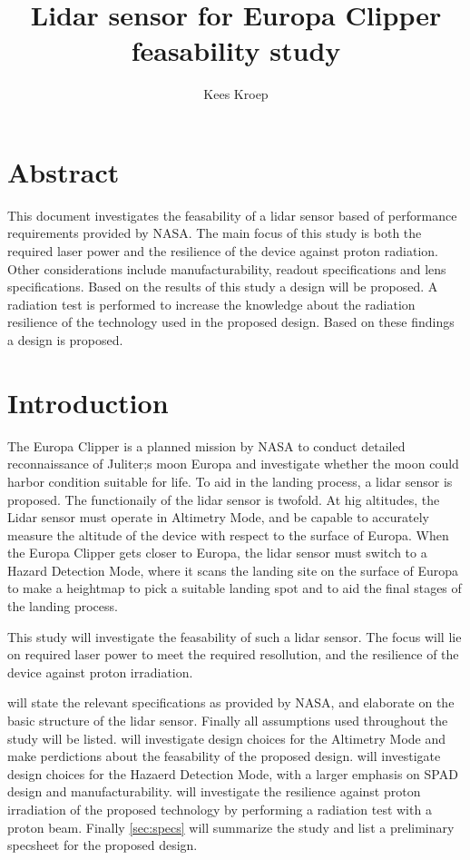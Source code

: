 \documentclass[]{report}
\title{Lidar sensor for Europa Clipper feasability study}
\author{Kees Kroep}
\begin{document}
  \maketitle


\section*{Abstract}
This document investigates the feasability of a lidar sensor based of performance requirements provided by NASA. The main focus of this study is both the required laser power and the resilience of the device against proton radiation. Other considerations include manufacturability, readout specifications and lens specifications. Based on the results of this study a design will be proposed. A radiation test is performed to increase the knowledge about the radiation resilience of the technology used in the proposed design. Based on these findings a design is proposed.

\tableofcontents
\clearpage

\section*{Introduction}
The Europa Clipper is a planned mission by NASA  to conduct  detailed reconnaissance of Juliter;s moon Europa and investigate whether the moon could harbor condition suitable for life. To aid in the landing process, a lidar sensor is proposed. The functionaily of the lidar sensor is twofold. At hig altitudes, the Lidar sensor must operate in Altimetry Mode, and be capable to accurately measure the altitude of the device with respect to the surface of Europa. When the Europa Clipper gets closer to Europa, the lidar sensor must switch to a Hazard Detection Mode, where it scans the landing site on the surface of Europa to make a heightmap to pick a suitable landing spot and to aid the final stages of the landing process.

This study will investigate the feasability of such a lidar sensor. The focus will lie on required laser power to meet the required resollution, and the resilience of the device against proton irradiation. 

 will state the relevant specifications as provided by NASA, and elaborate on the basic structure of the lidar sensor. Finally all assumptions used throughout the study will be listed.  will investigate design choices for the Altimetry Mode and make perdictions about the feasability of the proposed design.  will investigate design choices for the Hazaerd Detection Mode, with a larger emphasis on SPAD design and manufacturability.  will investigate the resilience against proton irradiation of the proposed technology by performing a radiation test with a proton beam. Finally \cref{sec:specs} will summarize the study and list a preliminary specsheet for the proposed design.
\end{document}
